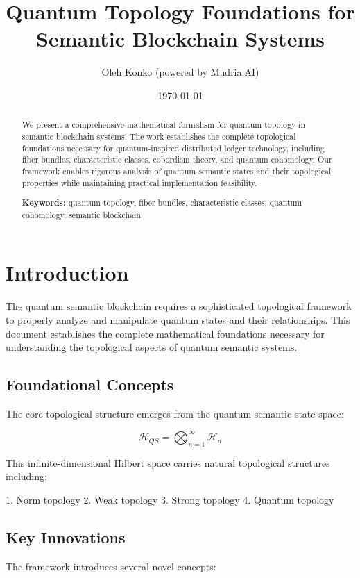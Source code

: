 \documentclass[12pt]{article}
\title{Quantum Topology Foundations for Semantic Blockchain Systems}
\author{Oleh Konko (powered by Mudria.AI)}
\date{\today}
\begin{document}
\maketitle

\begin{abstract}
We present a comprehensive mathematical formalism for quantum topology in semantic blockchain systems. The work establishes the complete topological foundations necessary for quantum-inspired distributed ledger technology, including fiber bundles, characteristic classes, cobordism theory, and quantum cohomology. Our framework enables rigorous analysis of quantum semantic states and their topological properties while maintaining practical implementation feasibility.

\textbf{Keywords:} quantum topology, fiber bundles, characteristic classes, quantum cohomology, semantic blockchain
\end{abstract}

\section{Introduction}

The quantum semantic blockchain requires a sophisticated topological framework to properly analyze and manipulate quantum states and their relationships. This document establishes the complete mathematical foundations necessary for understanding the topological aspects of quantum semantic systems.

\subsection{Foundational Concepts}

The core topological structure emerges from the quantum semantic state space:

\begin{equation}
\mathcal{H}_{QS} = \bigotimes_{n=1}^{\infty} \mathcal{H}_n
\end{equation}

This infinite-dimensional Hilbert space carries natural topological structures including:

1. Norm topology
2. Weak topology
3. Strong topology
4. Quantum topology

\subsection{Key Innovations}

The framework introduces several novel concepts:
\end{document}
